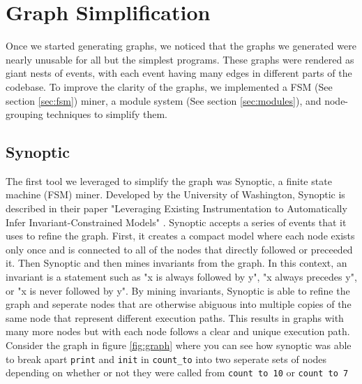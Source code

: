 \chapter{Graph Simplification}
\label{sec:simplification}
Once we started generating graphs, we noticed that the graphs we generated were nearly unusable for all but the simplest programs. These graphs were rendered as giant nests of events, with each event having many edges in different parts of the codebase. To improve the clarity of the graphs, we implemented a FSM (See section \ref{sec:fsm}) miner, a module system (See section \ref{sec:modules}), and node-grouping techniques to simplify them.

\section{Synoptic}
\label{sec:synoptic}
The first tool we leveraged to simplify the graph was Synoptic, a finite state machine (FSM) miner. Developed by the University of Washington, Synoptic is described in their paper "Leveraging Existing Instrumentation to Automatically Infer Invariant-Constrained Models" \cite{synoptic}. Synoptic accepts a series of events that it uses to refine the graph. First, it creates a compact model where each node exists only once and is connected to all of the nodes that directly followed or preceeded it. Then Synoptic and then mines invariants from the graph. In this context, an invariant is a statement such as "x is always followed by y", "x always precedes y", or "x is never followed by y". By mining invariants, Synoptic is able to refine the graph and seperate nodes that are otherwise abiguous into multiple copies of the same node that represent different execution paths. This results in graphs with many more nodes but with each node follows a clear and unique execution path. Consider the graph in figure \ref{fig:graph} where you can see how synoptic was able to break apart \texttt{print} and \texttt{init} in \texttt{count\_to} into two seperate sets of nodes depending on whether or not they were called from \texttt{count to 10} or \texttt{count to 7}


